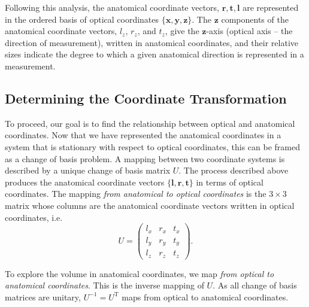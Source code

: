 \documentclass[preprint,NumberedRefs]{JASA}
\begin{document}
\par{Following this analysis, the anatomical coordinate vectors,  $\mathbf{r}, \mathbf{t}, \mathbf{l}$ are represented in the ordered basis of optical coordinates $\{\mathbf{x},\mathbf{y},\mathbf{z}\}$.  The $\mathbf{z}$ components of the anatomical coordinate vectors, $l_z$, $r_z$, and $t_z$, give the $\mathbf{z}$-axis (optical axis -- the direction of measurement), written in anatomical coordinates, and their relative sizes indicate the degree to which a given anatomical direction is represented in a measurement.}

\subsection{Determining the Coordinate Transformation}
\par{To proceed, our goal is to find the relationship between optical and anatomical coordinates. Now that we have represented the anatomical coordinates in a system that is stationary with respect to optical coordinates, this can be framed as a change of basis problem. A mapping between two coordinate systems is described by a unique change of basis matrix $U$. The process described above produces the anatomical coordinate vectors $\{\mathbf{l},\mathbf{r},\mathbf{t}\}$ in terms of optical coordinates. The mapping \textit{from anatomical to optical coordinates} is the $3\times 3$ matrix whose columns are the anatomical coordinate vectors written in optical coordinates, i.e.
\renewcommand*{\arraystretch}{.5}
\begin{equation}
U = \begin{pmatrix} l_{x} & r_{x} & t_{x} \\
l_{y} & r_{y} & t_{y} \\
l_{z} & r_{z} & t_{z}\end{pmatrix}.
\end{equation}}
\par{To explore the volume in anatomical coordinates, we map \textit{from optical to anatomical coordinates}. This is the inverse mapping of $U$. As all change of basis matrices are unitary, $U^{-1} = U^\text{T}$ maps from optical to anatomical coordinates.}
\end{document}
